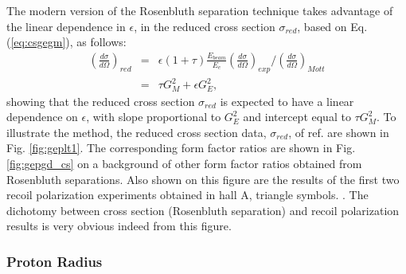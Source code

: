 The modern version of the Rosenbluth separation technique takes advantage 
of the linear dependence in $\epsilon$, in the reduced 
cross section $\sigma_{red}$, based on Eq. (\ref{eq:csgegm}), as follows:
\begin{eqnarray}
\left(\frac{d\sigma}{d\Omega}\right)_{red} &=& \epsilon(1+\tau)\frac{E_{beam}}{E_e}\left(\frac{d\sigma}{d\Omega}\right)_{exp} / \left(\frac{d\sigma}{d\Omega}\right)_{Mott} \nonumber \\
&=& \tau G_{M}^2+\epsilon G_{E}^2,
\label{eq:redcs}
\end{eqnarray}
\noindent showing that the reduced cross section $\sigma_{red}$ is expected to have a linear dependence on $\epsilon$, with slope proportional 
to $G_{E}^2$ and intercept equal to $\tau G_{M}^2$. To illustrate the method, the reduced cross section data, $\sigma_{red}$, of ref. 
\cite{qattan05} are shown in Fig. \ref{fig:geplt1}. The 
corresponding form factor ratios are shown in Fig. \ref{fig:gepgd_cs} on a background of other form factor ratios obtained from Rosenbluth
separations. Also shown on this figure are the results of the first two recoil polarization experiments obtained in hall A, triangle symbols. 
\cite{jones,punjabi05,gayou2}. The dichotomy between cross section (Rosenbluth separation) and recoil polarization results is very obvious indeed from this figure.

\subsubsection{Proton Radius}


